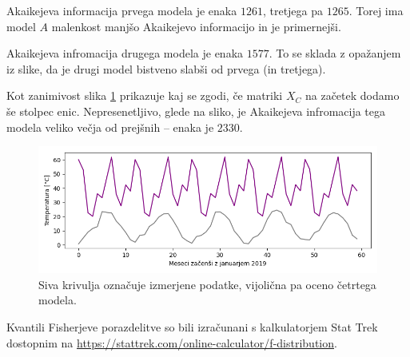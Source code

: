\documentclass[12pt, a4paper]{article}
\begin{document}
Akaikejeva informacija prvega modela je enaka $1261$,
tretjega pa $1265$. Torej ima model $A$ malenkost
manjšo Akaikejevo informacijo in je primernejši.

Akaikejeva infromacija drugega modela je enaka $1577$. 
To se sklada z opažanjem iz slike, da je drugi model bistveno
slabši od prvega (in tretjega).

Kot zanimivost slika \ref{png:cetrti} prikazuje kaj se zgodi, 
če matriki $X_C$ na začetek dodamo še stolpec enic.
Nepresenetljivo, glede na sliko, je Akaikejeva infromacija tega modela veliko 
večja od prejšnih -- enaka je $2330$.
\begin{figure}[H]
    \centering
    \includegraphics[width=14cm]{Slike/cetrti_model.png}
    \caption{Siva krivulja označuje izmerjene podatke, vijolična pa oceno 
    četrtega modela.}
    \label{png:cetrti}
\end{figure}

\newpage

\nocite{*}
\printbibliography
{}

Kvantili Fisherjeve porazdelitve so bili izračunani s kalkulatorjem Stat Trek
dostopnim na \url{https://stattrek.com/online-calculator/f-distribution}.
\end{document}
